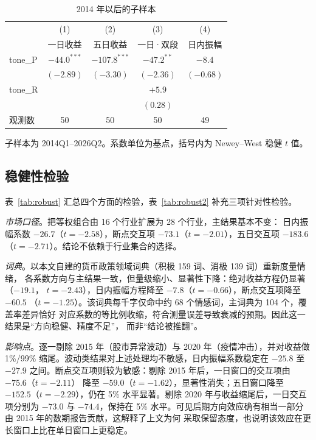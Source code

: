 \begin{table}[htbp]
\centering
\small
\begin{threeparttable}
\caption{2014 年以后的子样本}
\label{tab:post14}
\begin{tabular}{lcccc}
\toprule
 & (1) & (2) & (3) & (4) \\
 & 一日收益 & 五日收益 & 一日·双段 & 日内振幅 \\
\midrule
tone\_P & $-44.0^{***}$ & $-107.8^{***}$ & $-47.2^{**}$ & $-8.4$ \\
        & $(-2.89)$     & $(-3.30)$      & $(-2.36)$    & $(-0.68)$ \\
tone\_R &               &                & $+5.9$       & \\
        &               &                & $(0.28)$     & \\
\midrule
观测数  & 50 & 50 & 50 & 49 \\
\bottomrule
\end{tabular}
\begin{tablenotes}[flushleft]
\footnotesize
\item 子样本为 2014Q1--2026Q2。系数单位为基点，括号内为 Newey--West 稳健 $t$ 值。
\end{tablenotes}
\end{threeparttable}
\end{table}

\subsection{稳健性检验}

表~\ref{tab:robust} 汇总四个方面的检验，表~\ref{tab:robust2} 补充三项针对性检验。

\emph{市场口径}。把等权组合由 16 个行业扩展为 28 个行业，主结果基本不变：
日内振幅系数 $-26.7$（$t=-2.58$），断点交互项 $-73.1$（$t=-2.01$），五日交互项
$-183.6$（$t=-2.71$）。结论不依赖于行业集合的选择。

\emph{词典}。以本文自建的货币政策领域词典（积极 159 词、消极 139 词）重新度量情绪，
各系数方向与主结果一致，但量级缩小、显著性下降：绝对收益方程仍显著（$-19.1$，
$t=-2.43$），日内振幅方程降至 $-7.8$（$t=-0.66$），断点交互项降至 $-60.5$
（$t=-1.25$）。该词典每千字仅命中约 68 个情感词，主词典为 104 个，覆盖率差异恰好
对应系数的等比例收缩，符合测量误差导致衰减的预期。因此这一结果是``方向稳健、精度不足''，
而非``结论被推翻''。

\emph{影响点}。逐一剔除 2015 年（股市异常波动）与 2020 年（疫情冲击），并对收益做
1\%/99\% 缩尾。波动类结果对上述处理均不敏感，日内振幅系数稳定在 $-25.8$ 至 $-27.9$
之间。断点交互项则较为敏感：剔除 2015 年后，一日窗口的交互项由 $-75.6$（$t=-2.11$）
降至 $-59.0$（$t=-1.62$），显著性消失；五日窗口降至 $-152.5$（$t=-2.29$），仍在 5\%
水平显著。剔除 2020 年与收益缩尾后，一日交互项分别为 $-73.0$ 与 $-74.4$，保持在 5\%
水平。可见后期方向效应确有相当一部分由 2015 年的数期报告贡献，这解释了上文为何
采取保留态度，也说明该效应在更长窗口上比在单日窗口上更稳定。

